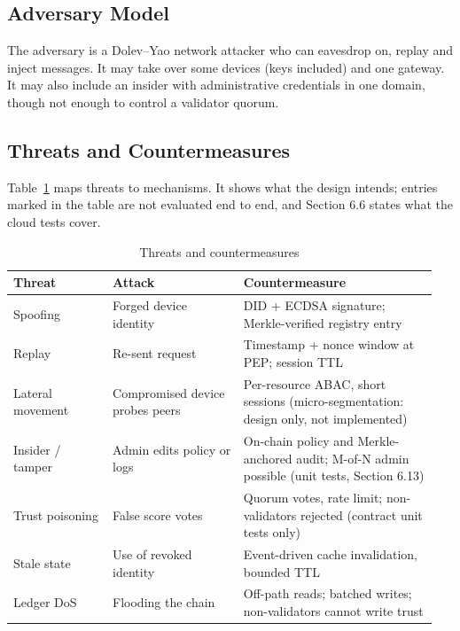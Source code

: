 \documentclass[a4paper,5p,times,twocolumn,number,sort&compress]{elsarticle}
\begin{document}
\subsection{Adversary Model}

The adversary is a Dolev--Yao network attacker who can eavesdrop on, replay and inject messages. It may take over some devices (keys included) and one gateway. It may also include an insider with administrative credentials in one domain, though not enough to control a validator quorum.

\subsection{Threats and Countermeasures}

Table~\ref{tab:threat} maps threats to mechanisms. It shows what the design intends; entries marked in the table are not evaluated end to end, and Section 6.6 states what the cloud tests cover.

\begin{table}[!t]
\caption{Threats and countermeasures}
\label{tab:threat}
\footnotesize
\renewcommand{\arraystretch}{0.92}\setlength{\tabcolsep}{2pt}
\begin{tabular}{>{\raggedright\arraybackslash}p{0.224\linewidth}>{\raggedright\arraybackslash}p{0.292\linewidth}>{\raggedright\arraybackslash}p{0.431\linewidth}}
\toprule
\textbf{Threat} & \textbf{Attack} & \textbf{Countermeasure} \\
\midrule
Spoofing & Forged device identity & DID + ECDSA signature; Merkle-verified registry entry \\
Replay & Re-sent request & Timestamp + nonce window at PEP; session TTL \\
Lateral movement & Compromised device probes peers & Per-resource ABAC, short sessions (micro-segmentation: design only, not implemented) \\
Insider / tamper & Admin edits policy or logs & On-chain policy and Merkle-anchored audit; M-of-N admin possible (unit tests, Section 6.13) \\
Trust poisoning & False score votes & Quorum votes, rate limit; non-validators rejected (contract unit tests only) \\
Stale state & Use of revoked identity & Event-driven cache invalidation, bounded TTL \\
Ledger DoS & Flooding the chain & Off-path reads; batched writes; non-validators cannot write trust \\
\bottomrule
\end{tabular}
\end{table}
\end{document}
